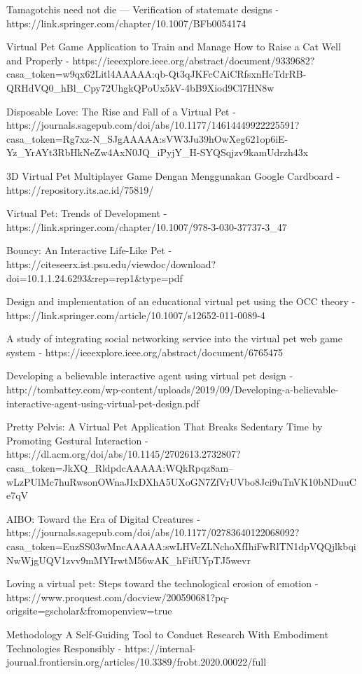 Tamagotchis need not die — Verification of statemate designs - https://link.springer.com/chapter/10.1007/BFb0054174


Virtual Pet Game Application to Train and Manage How to Raise a Cat Well and Properly - https://ieeexplore.ieee.org/abstract/document/9339682?casa_token=w9qx62Litl4AAAAA:qb-Qt3qJKFcCAiCRfsxnHcTdrRB-QRHdVQ0_hBl_Cpy72UhgkQPoUx5kV-4bB9Xiod9Cl7HN8w

Disposable Love: The Rise and Fall of a Virtual Pet - https://journals.sagepub.com/doi/abs/10.1177/14614449922225591?casa_token=Rg7xz-N_SJgAAAAA:sVW3Ju39hOwXeg621op6iE-Yz_YrAYt3RbHkNeZw4AxN0JQ_iPyjY_H-SYQSqjzv9kamUdrzh43x

3D Virtual Pet Multiplayer Game Dengan Menggunakan Google Cardboard - https://repository.its.ac.id/75819/

Virtual Pet: Trends of Development - https://link.springer.com/chapter/10.1007/978-3-030-37737-3_47

Bouncy: An Interactive Life-Like Pet - https://citeseerx.ist.psu.edu/viewdoc/download?doi=10.1.1.24.6293&rep=rep1&type=pdf

Design and implementation of an educational virtual pet using the OCC theory - https://link.springer.com/article/10.1007/s12652-011-0089-4

A study of integrating social networking service into the virtual pet web game system - https://ieeexplore.ieee.org/abstract/document/6765475

Developing a believable interactive agent using
virtual pet design - http://tombattey.com/wp-content/uploads/2019/09/Developing-a-believable-interactive-agent-using-virtual-pet-design.pdf

Pretty Pelvis: A Virtual Pet Application That Breaks Sedentary Time by Promoting Gestural Interaction - https://dl.acm.org/doi/abs/10.1145/2702613.2732807?casa_token=JkXQ_RldpdcAAAAA:WQkRpqz8am--wLzPUlMc7huRwsonOWnaJIxDXhA5UXoGN7ZfVrUVbo8Jci9uTnVK10bNDuuCe7qV

AIBO: Toward the Era of Digital Creatures - https://journals.sagepub.com/doi/abs/10.1177/02783640122068092?casa_token=EuzSS03wMncAAAAA:swLHVeZLNchoXfIhiFwRlTN1dpVQQjlkbqiNwWjgUQV1zvv9mMYIrwtM56wAK_hFifUYpTJ5wevr

Loving a virtual pet: Steps toward the technological erosion of emotion - https://www.proquest.com/docview/200590681?pq-origsite=gscholar&fromopenview=true




Methodology
A Self-Guiding Tool to Conduct Research With Embodiment Technologies Responsibly - https://internal-journal.frontiersin.org/articles/10.3389/frobt.2020.00022/full


